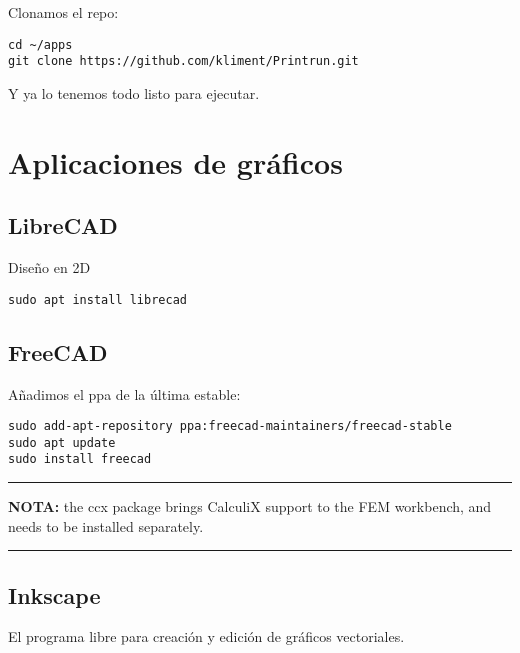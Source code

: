 \documentclass[
  12pt,
  spanish,
]{article}
\begin{document}
Clonamos el repo:

\begin{verbatim}
cd ~/apps
git clone https://github.com/kliment/Printrun.git
\end{verbatim}

Y ya lo tenemos todo listo para ejecutar.

\hypertarget{aplicaciones-de-gruxe1ficos}{%
\section{Aplicaciones de gráficos}\label{aplicaciones-de-gruxe1ficos}}

\hypertarget{librecad}{%
\subsection{LibreCAD}\label{librecad}}

Diseño en 2D

\begin{verbatim}
sudo apt install librecad
\end{verbatim}

\hypertarget{freecad}{%
\subsection{FreeCAD}\label{freecad}}

Añadimos el ppa de la última estable:

\begin{verbatim}
sudo add-apt-repository ppa:freecad-maintainers/freecad-stable
sudo apt update
sudo install freecad
\end{verbatim}

\begin{center}\rule{0.5\linewidth}{\linethickness}\end{center}

\textbf{NOTA:} the ccx package brings CalculiX support to the FEM
workbench, and needs to be installed separately.

\begin{center}\rule{0.5\linewidth}{\linethickness}\end{center}

\hypertarget{inkscape}{%
\subsection{Inkscape}\label{inkscape}}

El programa libre para creación y edición de gráficos vectoriales.
\end{document}
